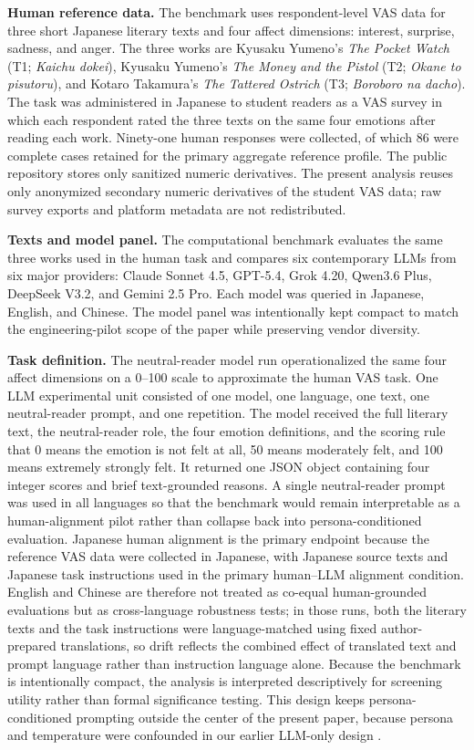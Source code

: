 \textbf{Human reference data.} The benchmark uses respondent-level VAS data for three short Japanese literary texts and four affect dimensions: interest, surprise, sadness, and anger. The three works are Kyusaku Yumeno's \textit{The Pocket Watch} (T1; \textit{Kaichu dokei}), Kyusaku Yumeno's \textit{The Money and the Pistol} (T2; \textit{Okane to pisutoru}), and Kotaro Takamura's \textit{The Tattered Ostrich} (T3; \textit{Boroboro na dacho}). The task was administered in Japanese to student readers as a VAS survey in which each respondent rated the three texts on the same four emotions after reading each work. Ninety-one human responses were collected, of which 86 were complete cases retained for the primary aggregate reference profile. The public repository stores only sanitized numeric derivatives. The present analysis reuses only anonymized secondary numeric derivatives of the student VAS data; raw survey exports and platform metadata are not redistributed.

\textbf{Texts and model panel.} The computational benchmark evaluates the same three works used in the human task and compares six contemporary LLMs from six major providers: Claude Sonnet 4.5, GPT-5.4, Grok 4.20, Qwen3.6 Plus, DeepSeek V3.2, and Gemini 2.5 Pro. Each model was queried in Japanese, English, and Chinese. The model panel was intentionally kept compact to match the engineering-pilot scope of the paper while preserving vendor diversity.

\textbf{Task definition.} The neutral-reader model run operationalized the same four affect dimensions on a 0--100 scale to approximate the human VAS task. One LLM experimental unit consisted of one model, one language, one text, one neutral-reader prompt, and one repetition. The model received the full literary text, the neutral-reader role, the four emotion definitions, and the scoring rule that 0 means the emotion is not felt at all, 50 means moderately felt, and 100 means extremely strongly felt. It returned one JSON object containing four integer scores and brief text-grounded reasons. A single neutral-reader prompt was used in all languages so that the benchmark would remain interpretable as a human-alignment pilot rather than collapse back into persona-conditioned evaluation. Japanese human alignment is the primary endpoint because the reference VAS data were collected in Japanese, with Japanese source texts and Japanese task instructions used in the primary human--LLM alignment condition. English and Chinese are therefore not treated as co-equal human-grounded evaluations but as cross-language robustness tests; in those runs, both the literary texts and the task instructions were language-matched using fixed author-prepared translations, so drift reflects the combined effect of translated text and prompt language rather than instruction language alone. Because the benchmark is intentionally compact, the analysis is interpreted descriptively for screening utility rather than formal significance testing. This design keeps persona-conditioned prompting outside the center of the present paper, because persona and temperature were confounded in our earlier LLM-only design \cite{shirahama2026mdpi}.

